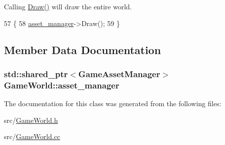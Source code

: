 Calling \hyperlink{classGameWorld_a275418607d8286979b276f165ad5876b}{Draw()} will draw the entire world. 


\begin{DoxyCode}
57                      \{
58   \hyperlink{classGameWorld_aec5c0bca4fb5a41e4aac2dce2871266d}{asset\_manager}->Draw();
59 \}
\end{DoxyCode}


\subsection{Member Data Documentation}
\hypertarget{classGameWorld_aec5c0bca4fb5a41e4aac2dce2871266d}{}
\subsubsection[{asset\+\_\+manager}]{\setlength{\rightskip}{0pt plus 5cm}std\+::shared\+\_\+ptr$<${\bf Game\+Asset\+Manager}$>$ Game\+World\+::asset\+\_\+manager\hspace{0.3cm}{\ttfamily [private]}}\label{classGameWorld_aec5c0bca4fb5a41e4aac2dce2871266d}


The documentation for this class was generated from the following files\+:\begin{DoxyCompactItemize}
\item 
src/\hyperlink{GameWorld_8h}{Game\+World.\+h}\item 
src/\hyperlink{GameWorld_8cc}{Game\+World.\+cc}\end{DoxyCompactItemize}
